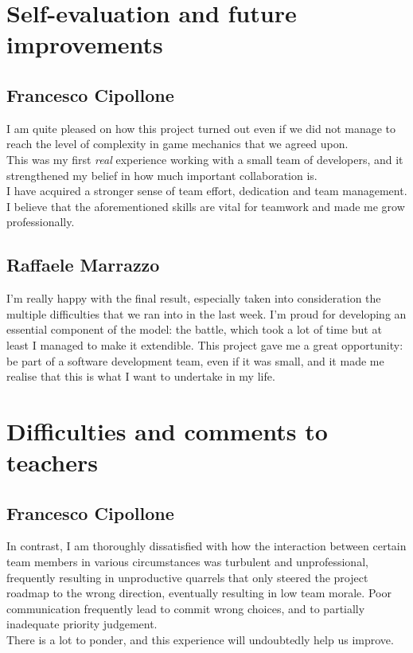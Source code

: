 \documentclass[12pt, a4paper]{report}
\theoremstyle{definition}
\begin{document}
\section{Self-evaluation and future improvements}

    \subsection*{Francesco Cipollone}

    I am quite pleased on how this project turned out even if we did not manage to reach the level of complexity in game mechanics that we agreed upon.\\
    This was my first \textit{real} experience working with a small team of developers, and it strengthened my belief in how much important collaboration is.\\
    I have acquired a stronger sense of team effort, dedication and team management. I believe that the aforementioned skills are vital for teamwork and made
    me grow professionally.

    \subsection*{Raffaele Marrazzo}
    
    I'm really happy with the final result, especially taken into consideration the multiple difficulties that we ran into in the last week.
    I'm proud for developing an essential component of the model: the battle, which took a lot of time but at least I managed to make it extendible.
    This project gave me a great opportunity: be part of a software development team, even if it was small, and it made me realise that this is what 
    I want to undertake in my life.

\section{Difficulties and comments to teachers}

    \subsection*{Francesco Cipollone}

    In contrast, I am thoroughly dissatisfied with how the interaction between certain team members in various circumstances was turbulent and unprofessional,
    frequently resulting in unproductive quarrels that only steered the project roadmap to the wrong direction, eventually resulting in low team morale.
    Poor communication frequently lead to commit wrong choices, and to partially inadequate priority judgement.\\
    There is a lot to ponder, and this experience will undoubtedly help us improve.
\end{document}
